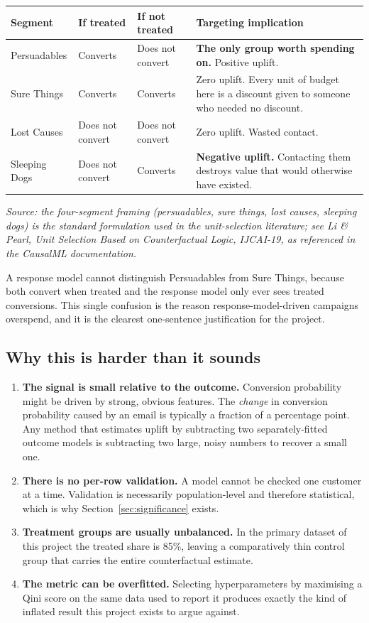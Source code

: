 \documentclass[11pt,a4paper]{article}
\newcommand{\srcnote}[1]{{\footnotesize\itshape\color{teal}Source: #1}}
\begin{document}
\begin{tabularx}{\textwidth}{@{}L{3.0cm}L{2.6cm}L{2.6cm}X@{}}
\toprule
\textbf{Segment} & \textbf{If treated} & \textbf{If not treated} & \textbf{Targeting implication} \\
\midrule
Persuadables & Converts & Does not convert & \textbf{The only group worth spending on.} Positive uplift. \\
Sure Things & Converts & Converts & Zero uplift. Every unit of budget here is a discount given
to someone who needed no discount. \\
Lost Causes & Does not convert & Does not convert & Zero uplift. Wasted contact. \\
Sleeping Dogs & Does not convert & Converts & \textbf{Negative uplift.} Contacting them destroys
value that would otherwise have existed. \\
\bottomrule
\end{tabularx}

\srcnote{the four-segment framing (persuadables, sure things, lost causes, sleeping dogs) is the
standard formulation used in the unit-selection literature; see Li \& Pearl, \emph{Unit Selection
Based on Counterfactual Logic}, IJCAI-19, as referenced in the CausalML documentation.}

A response model cannot distinguish Persuadables from Sure Things, because both convert when
treated and the response model only ever sees treated conversions. This single confusion is the
reason response-model-driven campaigns overspend, and it is the clearest one-sentence justification
for the project.

\subsection{Why this is harder than it sounds}

\begin{enumerate}
\item \textbf{The signal is small relative to the outcome.} Conversion probability might be
driven by strong, obvious features. The \emph{change} in conversion probability caused by an email
is typically a fraction of a percentage point. Any method that estimates uplift by subtracting two
separately-fitted outcome models is subtracting two large, noisy numbers to recover a small one.
\item \textbf{There is no per-row validation.} A model cannot be checked one customer at a time.
Validation is necessarily population-level and therefore statistical, which is why
Section~\ref{sec:significance} exists.
\item \textbf{Treatment groups are usually unbalanced.} In the primary dataset of this project the
treated share is 85\%, leaving a comparatively thin control group that carries the entire
counterfactual estimate.
\item \textbf{The metric can be overfitted.} Selecting hyperparameters by maximising a Qini score
on the same data used to report it produces exactly the kind of inflated result this project exists
to argue against.
\end{enumerate}
\end{document}

